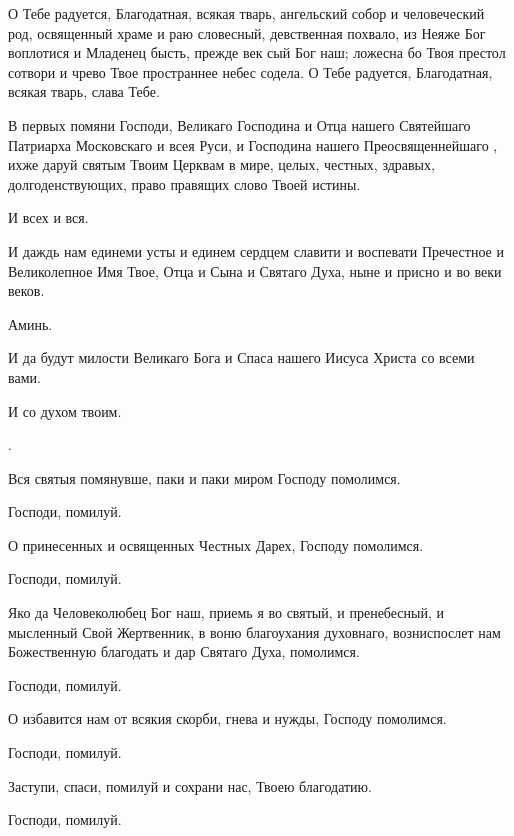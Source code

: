 \begin{mymulticols}
О Тебе радуется, Благодатная, всякая тварь, ангельский собор и человеческий род, освященный храме и раю словесный, девственная похвало, из Неяже Бог воплотися и Младенец бысть, прежде век сый Бог наш; ложесна бо Твоя престол сотвори и чрево Твое пространнее небес содела. О Тебе радуется, Благодатная, всякая тварь, слава Тебе.\myemph{ ]}

 В первых помяни Господи, Великаго Господина и Отца нашего   Святейшаго Патриарха Московскаго и всея Руси, и Господина нашего Преосвященнейшаго , ихже даруй святым Твоим Церквам в мире, целых, честных, здравых, долгоденствующих, право правящих слово Твоей истины. 

 И всех и вся.

 И даждь нам единеми усты и единем сердцем славити и воспевати Пречестное и Великолепное Имя Твое, Отца и Сына и Святаго Духа, ныне и присно и во веки веков. 

 Аминь.

 И да будут милости Великаго Бога и Спаса нашего Иисуса Христа со всеми вами.

 И со духом твоим.

. 


 Вся святыя помянувше, паки и паки миром Господу помолимся. 

 Господи, помилуй.

 О принесенных и освященных Честных Дарех, Господу помолимся. 

 Господи, помилуй.

 Яко да Человеколюбец Бог наш, приемь я во святый, и пренебесный, и мысленный Свой Жертвенник, в воню благоухания духовнаго, возниспослет нам Божественную благодать и дар Святаго Духа, помолимся. 

 Господи, помилуй.

 О избавится нам от всякия скорби, гнева и нужды, Господу помолимся. 

 Господи, помилуй.

 Заступи, спаси, помилуй и сохрани нас, Твоею благодатию. 

 Господи, помилуй.


\end{mymulticols}
